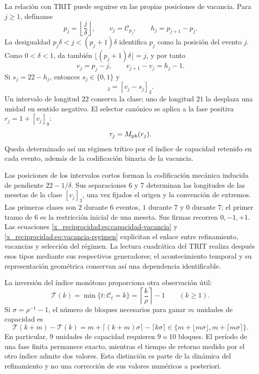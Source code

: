 La relación con TRIT puede seguirse en las propias posiciones de vacancia.
Para \(j\geq1\), defínanse
\[
 p_j=\left\lfloor\frac j\delta\right\rfloor,\qquad
 v_j=\mathcal C_{p_j},\qquad h_j=p_{j+1}-p_j.
\]
La desigualdad \(p_j\delta<j<(p_j+1)\delta\) identifica \(p_j\)
como la posición del evento \(j\). Como \(0<\delta<1\), da también
\(\lfloor(p_j+1)\delta\rfloor=j\), y por tanto
\[
 v_j=p_j-j,\qquad
 v_{j+1}-v_j=h_j-1.
\]
Si \(s_j=22-h_j\), entonces \(s_j\in\{0,1\}\) y
\begin{equation}
 [v_{j+1}]_3=[v_j-s_j]_3.
 \label{x_reciprocidad:eq:vacancia-regimen}
\end{equation}
Un intervalo de longitud \(22\) conserva la clase; uno de longitud
\(21\) la desplaza una unidad en sentido negativo. El selector canónico
se aplica a la fase positiva \(r_j=1+[v_j]_9\):
\[
 \tau_j=M_{\rm ph}(r_j).
\]
Queda determinado así un régimen trítico por el índice de capacidad
retenido en cada evento, además de la codificación binaria de la vacancia.

Las posiciones de los intervalos cortos forman la codificación mecánica
inducida de pendiente \(22-1/\delta\). Sus separaciones \(6\) y \(7\)
determinan las longitudes de las mesetas de la clase \([v_j]_3\), una
vez fijados el origen y la convención de extremos. Las primeras clases
son \(2\) durante \(6\) eventos, \(1\) durante \(7\) y \(0\) durante
\(7\); el primer tramo de \(6\) es la restricción inicial de una meseta.
Sus firmas recorren \(0,-1,+1\). Las ecuaciones
\eqref{x_reciprocidad:eq:capacidad-vacancia} y \eqref{x_reciprocidad:eq:vacancia-regimen} explicitan el
enlace entre refinamiento, vacancias y selección del régimen. La lectura
cuadrática del TRIT realiza después esos tipos mediante sus respectivos
generadores; el acontecimiento temporal y su representación geométrica
conservan así una dependencia identificable.

La inversión del índice monótono proporciona otra observación útil:
\[
 \mathcal T(k)=\min\{t:\mathcal C_t=k\}
   =\left\lceil\frac k\rho\right\rceil-1\qquad(k\geq1).
\]
Si \(\sigma=\rho^{-1}-1\), el número de bloques necesarios para ganar
\(m\) unidades de capacidad es
\[
 \mathcal T(k+m)-\mathcal T(k)
 =m+\lceil(k+m)\sigma\rceil-\lceil k\sigma\rceil
 \in\{m+\lfloor m\sigma\rfloor,m+\lceil m\sigma\rceil\}.
\]
En particular, \(9\) unidades de capacidad requieren \(9\) o \(10\)
bloques. El período de una fase finita permanece exacto, mientras el
tiempo de retorno medido por el otro índice admite dos valores. Esta
distinción es parte de la dinámica del refinamiento y no una corrección
de sus valores numéricos a posteriori.

